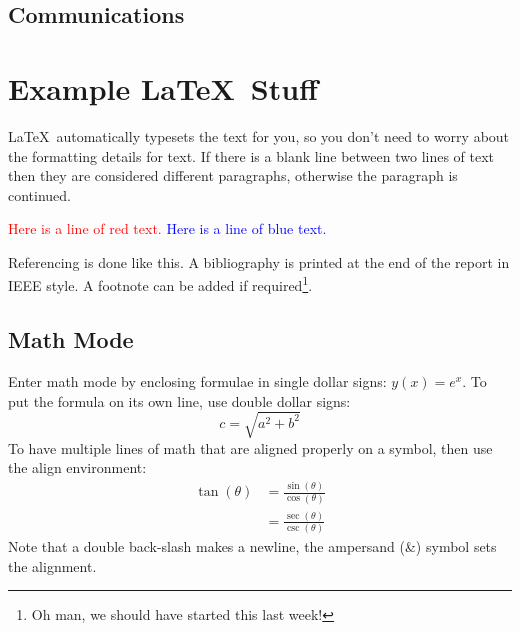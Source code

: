 \documentclass[12pt]{article}
\begin{document}
\subsection{Communications}
















\newpage

\section{Example \LaTeX\ Stuff}

\LaTeX\ automatically typesets the text for you, so you don't need to worry about the formatting details for text.
If there is a blank line between two lines of text then they are considered different paragraphs, otherwise the paragraph is continued.

\textcolor{red}{Here is a line of red text.}
\textcolor{blue}{Here is a line of blue text.}

Referencing is done like this\cite{Varghese2012}. A bibliography is printed at the end of the report in IEEE style. A footnote can be added if required\footnote{Oh man, we should have started this last week!}.

\subsection{Math Mode}

Enter math mode by enclosing formulae in single dollar signs: $y(x) = e^x$.
To put the formula on its own line, use double dollar signs: $$c = \sqrt{a^2 + b^2}$$
To have multiple lines of math that are aligned properly on a symbol, then use the align environment:
\begin{align}
	\tan(\theta) &= \frac{\sin(\theta)}{\cos(\theta)} \\
		&= \frac{\sec(\theta)}{\csc(\theta)}
\end{align}
Note that a double back-slash makes a newline, the ampersand (\&) symbol sets the alignment.
\end{document}
